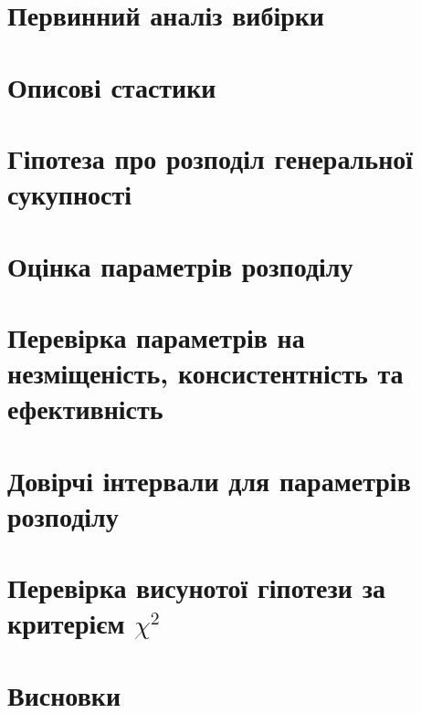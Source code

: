 \documentclass[14pt, a4paper, ukrainian]{extreport}
\begin{document}
	
	\chapter{Первинний аналіз вибірки}
	\chapter{Описові стастики}
	\chapter{Гіпотеза про розподіл генеральної сукупності}
	\chapter{Оцінка параметрів розподілу}
	\chapter{Перевірка параметрів на незміщеність, консистентність та ефективність}
	\chapter{Довірчі інтервали для параметрів розподілу}
	\chapter{Перевірка висунотої гіпотези за критерієм $\chi^2$}
	\chapter*{Висновки}
	
	
\end{document}
